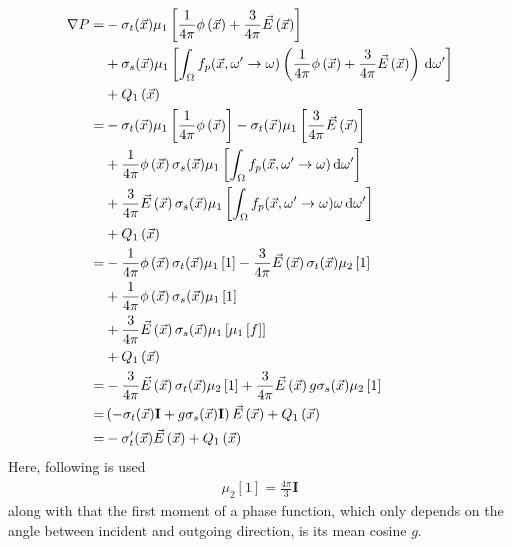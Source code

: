 \begin{align*}
\nabla P =&
-\sigma_t(\vec{x})\mu_1\left[\frac{1}{4\pi}\phi\left(\vec{x}\right) + \frac{3}{4\pi}\vec{E}\left(\vec{x}\right)\right]
\\&
+\sigma_s(\vec{x})\mu_1\left[\int_{\Omega}f_p(\vec{x}, \omega'\rightarrow\omega)\left(\frac{1}{4\pi}\phi\left(\vec{x}\right) + \frac{3}{4\pi}\vec{E}\left(\vec{x}\right)\right)\,\mathrm{d}\omega'\right]
\\&
\nonumber
+ Q_1\left(\vec{x}\right)
\\
=&
-\sigma_t(\vec{x})\mu_1\left[\frac{1}{4\pi}\phi\left(\vec{x}\right)\right]
-\sigma_t(\vec{x})\mu_1\left[\frac{3}{4\pi}\vec{E}\left(\vec{x}\right)\right]
\\
&
+\frac{1}{4\pi}\phi\left(\vec{x}\right)\sigma_s(\vec{x})\mu_1\left[\int_{\Omega}f_p(\vec{x}, \omega'\rightarrow\omega)\,\mathrm{d}\omega'\right]
\\
&
+\frac{3}{4\pi}\vec{E}\left(\vec{x}\right)\sigma_s(\vec{x})\mu_1\left[\int_{\Omega}f_p(\vec{x}, \omega'\rightarrow\omega)\omega\,\mathrm{d}\omega'\right]
\\
&
+Q_1\left(\vec{x}\right)
\\
=&
-\frac{1}{4\pi}\phi\left(\vec{x}\right)\sigma_t(\vec{x})\mu_1\left[1\right]
-\frac{3}{4\pi}\vec{E}\left(\vec{x}\right)\sigma_t(\vec{x})\mu_2\left[1\right]
\\
&
+\frac{1}{4\pi}\phi\left(\vec{x}\right)\sigma_s(\vec{x})\mu_1\left[1\right]
\\
&
+\frac{3}{4\pi}\vec{E}\left(\vec{x}\right)\sigma_s(\vec{x})\mu_1\left[\mu_1\left[f\right]\right]
\\
&
+Q_1\left(\vec{x}\right)
\\
=&
-\frac{3}{4\pi}\vec{E}\left(\vec{x}\right)\sigma_t(\vec{x})\mu_2\left[1\right]
+\frac{3}{4\pi}\vec{E}\left(\vec{x}\right)g\sigma_s(\vec{x})\mu_2\left[1\right]
\\
=&
\left(-\sigma_t(\vec{x})\mathbf{I} + g\sigma_s(\vec{x})\mathbf{I}\right)\vec{E}\left(\vec{x}\right)
+Q_1\left(\vec{x}\right)
\\
=&
-\sigma_t'(\vec{x})\vec{E}\left(\vec{x}\right)
+Q_1\left(\vec{x}\right)
\end{align*}
Here, following is used
\begin{align*}
\mu_2[1] = \frac{4\pi}{3}\mathbf{I}
\end{align*}
along with that the first moment of a phase function, which only depends on the angle between incident and outgoing direction, is its mean cosine $g$.

